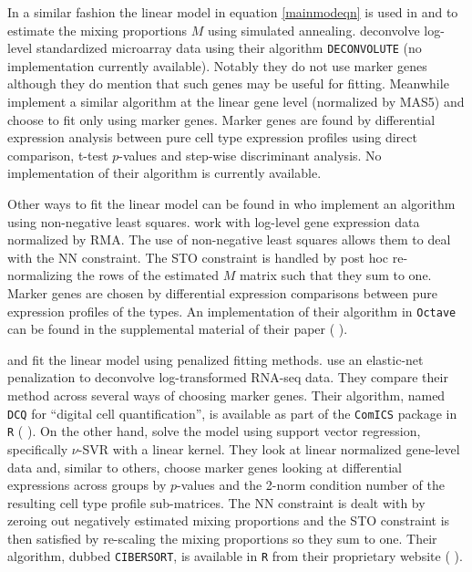 \documentclass[reqno,12pt,oneside]{report}\usepackage[]{graphicx}\usepackage[]{color}
\renewcommand{\citet}[1]{(\citeauthor{#1} \citeyear{#1})}
\theoremstyle{plain}
\theoremstyle{definition}
\theoremstyle{remark}
\numberwithin{theorem}{chapter}     %
\begin{document}
In a similar fashion the linear model in equation \ref{mainmodeqn} is used in \cite{Lu2003} and \cite{Wang2006} to estimate the mixing proportions $M$ using simulated annealing. \citeauthor{Lu2003} deconvolve log-level standardized microarray data using their algorithm \verb+DECONVOLUTE+ (no implementation currently available). Notably they do not use marker genes although they do mention that such genes may be useful for fitting. Meanwhile \cite{Wang2006} implement a similar algorithm at the linear gene level (normalized by MAS5) and choose to fit only using marker genes. Marker genes are found by differential expression analysis between pure cell type expression profiles using direct comparison, t-test $p$-values and step-wise discriminant analysis. No implementation of their algorithm is currently available.

Other ways to fit the linear model can be found in \cite{Qiao2012} who implement an algorithm using non-negative least squares. \cite{Qiao2012} work with log-level gene expression data normalized by RMA. The use of non-negative least squares allows them to deal with the NN constraint. The STO constraint is handled by post hoc re-normalizing the rows of the estimated $M$ matrix such that they sum to one. Marker genes are chosen by differential expression comparisons between pure expression profiles of the types. An implementation of their algorithm in \verb+Octave+ can be found in the supplemental material of their paper \citet{Qiao2012}. 

\cite{Newman2015} and \cite{Altboum2014} fit the linear model using penalized fitting methods. \citeauthor{Altboum2014} use an elastic-net penalization to deconvolve log-transformed RNA-seq data. They compare their method across several ways of choosing marker genes. Their algorithm, named \verb+DCQ+ for ``digital cell quantification'',  is available as part of the \verb+ComICS+ package in \verb+R+ \citet{ComICS2016}. On the other hand, \citeauthor{Newman2015} solve the model using support vector regression, specifically $\nu$-SVR with a linear kernel. They look at linear normalized gene-level data and, similar to others, choose marker genes looking at differential expressions across groups by $p$-values and the 2-norm condition number of the resulting cell type profile sub-matrices. The NN constraint is dealt with by zeroing out negatively estimated mixing proportions and the STO constraint is then satisfied by re-scaling the mixing proportions so they sum to one. Their algorithm, dubbed \verb+CIBERSORT+, is available in \verb+R+ from their proprietary website \citet{Newman2015}.
\end{document}
